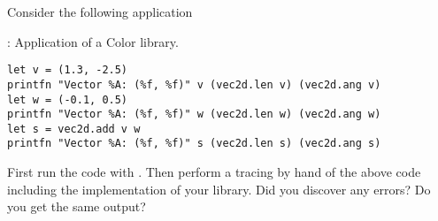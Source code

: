 Consider the following application
\begin{codeNOutput}{: Application of a Color library.}
  \begin{lstlisting}
let v = (1.3, -2.5)
printfn "Vector %A: (%f, %f)" v (vec2d.len v) (vec2d.ang v)
let w = (-0.1, 0.5)
printfn "Vector %A: (%f, %f)" w (vec2d.len w) (vec2d.ang w)
let s = vec2d.add v w
printfn "Vector %A: (%f, %f)" s (vec2d.len s) (vec2d.ang s)
  \end{lstlisting}
\end{codeNOutput}
First run the code with . Then perform a tracing by hand of the above code including the implementation of your library. Did you discover any errors? Do you get the same output?
